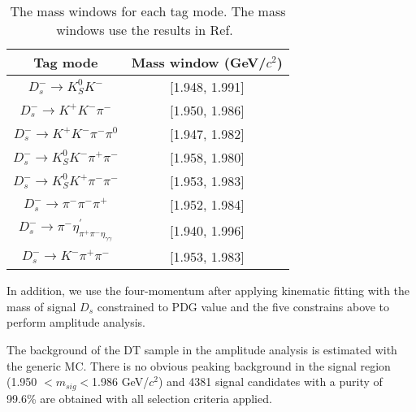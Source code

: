 \documentclass[aps,prd,twocolumn,showpacs,amsmath,amssymb]{revtex4-1}
\begin{document}
\begin{table}[htbp]
    \caption{ The mass windows for each tag mode. The mass windows use the results in Ref.~\cite{Doc-DB-630-v35} }
    \label{ST-mass-window}
    \begin{center}
        \begin{tabular}{cc}
            \hline\hline
            Tag mode & Mass window (GeV/$c^{2}$)  \\
            \hline
            $D_{s}^{-} \rightarrow K_{S}^{0}K^{-}$                          & [1.948, 1.991]    \\
            $D_{s}^{-} \rightarrow K^{+}K^{-}\pi^{-}$                       & [1.950, 1.986]    \\
            $D_{s}^{-} \rightarrow K^{+}K^{-}\pi^{-}\pi^{0}$                & [1.947, 1.982]    \\
            $D_{s}^{-} \rightarrow K_{S}^{0}K^{-}\pi^{+}\pi^{-}$            & [1.958, 1.980]    \\
            $D_{s}^{-} \rightarrow K_{S}^{0}K^{+}\pi^{-}\pi^{-}$            & [1.953, 1.983]    \\
            $D_{s}^{-} \rightarrow \pi^{-}\pi^{-}\pi^{+}$                   & [1.952, 1.984]    \\
            $D_{s}^{-} \rightarrow \pi^{-}\eta_{\pi^{+}\pi^{-}\eta_{\gamma\gamma}}^{'}$  & [1.940, 1.996]        \\
            $D_{s}^{-} \rightarrow K^{-}\pi^{+}\pi^{-}$                     & [1.953, 1.983]    \\
            \hline\hline
        \end{tabular}
    \end{center}
\end{table}

In addition, we use the four-momentum after applying kinematic fitting with the mass of signal $D_{s}$ constrained to PDG value and the five constrains above to perform amplitude analysis.

The background of the DT sample in the amplitude analysis is estimated with the generic MC.
There is no obvious peaking background in the signal region (1.950  $ < m_{sig} < $1.986 GeV/$c^{2}$) and 4381 signal candidates with a purity of 99.6\% are obtained with all selection criteria applied.
\end{document}

